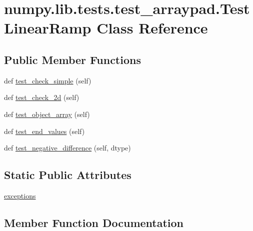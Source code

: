 \hypertarget{classnumpy_1_1lib_1_1tests_1_1test__arraypad_1_1TestLinearRamp}{}\section{numpy.\+lib.\+tests.\+test\+\_\+arraypad.\+Test\+Linear\+Ramp Class Reference}
\label{classnumpy_1_1lib_1_1tests_1_1test__arraypad_1_1TestLinearRamp}
\subsection*{Public Member Functions}
\begin{DoxyCompactItemize}
\item 
def \hyperlink{classnumpy_1_1lib_1_1tests_1_1test__arraypad_1_1TestLinearRamp_af1e74a8ca869ac50ddeb60d6b0972b04}{test\+\_\+check\+\_\+simple} (self)
\item 
def \hyperlink{classnumpy_1_1lib_1_1tests_1_1test__arraypad_1_1TestLinearRamp_a0b53b6fc70d3127ee66de02cc8e75d3e}{test\+\_\+check\+\_\+2d} (self)
\item 
def \hyperlink{classnumpy_1_1lib_1_1tests_1_1test__arraypad_1_1TestLinearRamp_a81061c869fca531103850fe5b6b99bfc}{test\+\_\+object\+\_\+array} (self)
\item 
def \hyperlink{classnumpy_1_1lib_1_1tests_1_1test__arraypad_1_1TestLinearRamp_a7ac406cf0002357acab1edfc2913760c}{test\+\_\+end\+\_\+values} (self)
\item 
def \hyperlink{classnumpy_1_1lib_1_1tests_1_1test__arraypad_1_1TestLinearRamp_a95e2e03b94cc422d2f9b13c93a30dbb3}{test\+\_\+negative\+\_\+difference} (self, dtype)
\end{DoxyCompactItemize}
\subsection*{Static Public Attributes}
\begin{DoxyCompactItemize}
\item 
\hyperlink{classnumpy_1_1lib_1_1tests_1_1test__arraypad_1_1TestLinearRamp_a6051ce71678e5f8a9587ab6c139c1cf2}{exceptions}
\end{DoxyCompactItemize}


\subsection{Member Function Documentation}
\mbox{\label{classnumpy_1_1lib_1_1tests_1_1test__arraypad_1_1TestLinearRamp_a0b53b6fc70d3127ee66de02cc8e75d3e}} 
